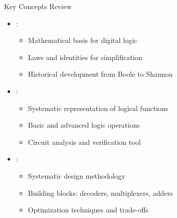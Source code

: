 \begin{frame}{Key Concepts Review}
\begin{itemize}
\item {}:
\begin{itemize}
\item Mathematical basis for digital logic
\item Laws and identities for simplification
\item Historical development from Boole to Shannon
\end{itemize}
\vspace{0.3cm}
\item {}:
\begin{itemize}
\item Systematic representation of logical functions
\item Basic and advanced logic operations
\item Circuit analysis and verification tool
\end{itemize}
\vspace{0.3cm}
\item {}:
\begin{itemize}
\item Systematic design methodology
\item Building blocks: decoders, multiplexers, adders
\item Optimization techniques and trade-offs
\end{itemize}
\end{itemize}
\end{frame}

